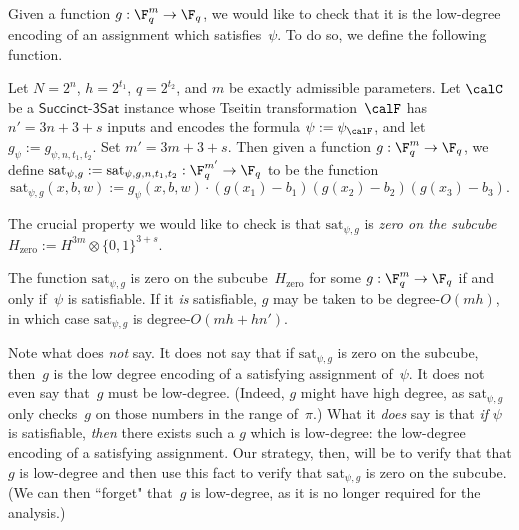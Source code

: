 \documentclass[11pt]{article}
\newcommand{\succinct}{\mathsf{Succinct}\text{-}\mathsf{3Sat}}
\begin{document}
Given a function $g:\F_q^m \rightarrow \F_q$,
we would like to check that it is the low-degree encoding of an assignment which satisfies~$\psi$.
To do so, we define the following function.
\begin{definition}\label{def:formula-function}
Let $N=2^n$, $h = 2^{t_1}$, $q= 2^{t_2}$, and $m$ be exactly admissible parameters.
Let $\calC$ be a $\succinct$ instance whose Tseitin transformation~$\calF$
has $n' = 3n + 3 + s$ inputs and encodes the formula $\psi := \psi_{\calF}$,
and let $g_\psi := g_{\psi, n, t_1, t_2}$.
Set $m' = 3m + 3 + s$.
Then given a function $g:\F_q^m \rightarrow \F_q$, 
we define $\mathrm{sat}_{\psi,g} := \mathrm{sat}_{\psi,g, n, t_1, t_2} : \F_q^{m'} \rightarrow \F_q$ to be the function
\begin{equation*}
\mathrm{sat}_{\psi,g}(x, b,w) := g_{\psi}(x, b, w) \cdot (g(x_1)-b_1) (g(x_2)-b_2) (g(x_3)-b_3).
\end{equation*}
\end{definition}
The crucial property we would like to check is that $\mathrm{sat}_{\psi, g}$ is \emph{zero on the subcube $H_{\mathrm{zero}} := H^{3m} \otimes \{0, 1\}^{3+s}$}.
\begin{proposition}\label{prop:zero-on-subcube}
The function $\mathrm{sat}_{\psi,g}$ is zero on the subcube~$H_{\mathrm{zero}}$ for some $g:\F_q^m\rightarrow \F_q$ if and only if~$\psi$ is satisfiable.
If it \emph{is} satisfiable, $g$ may be taken to be degree-$O(mh)$, in which case $\mathrm{sat}_{\psi,g}$ is  degree-$O(mh + h n')$.
\end{proposition}
Note what  does \emph{not} say.
It does not say that if $\mathrm{sat}_{\psi,g}$ is zero on the subcube, then~$g$ is the low degree encoding of a satisfying assignment of~$\psi$.
It does not even say that~$g$ must be low-degree.
(Indeed, $g$ might have high degree, as $\mathrm{sat}_{\psi,g}$ only checks~$g$ on those numbers in the range of~$\pi$.)
What it \emph{does} say is that \emph{if} $\psi$ is satisfiable, \emph{then} there exists such a $g$ which is low-degree: the low-degree encoding of a satisfying assignment.
Our strategy, then, will be to verify that that $g$ is low-degree and then use this fact to verify that $\mathrm{sat}_{\psi,g}$ is zero on the subcube.
(We can then ``forget" that~$g$ is low-degree, as it is no longer required for the analysis.)
\end{document}
